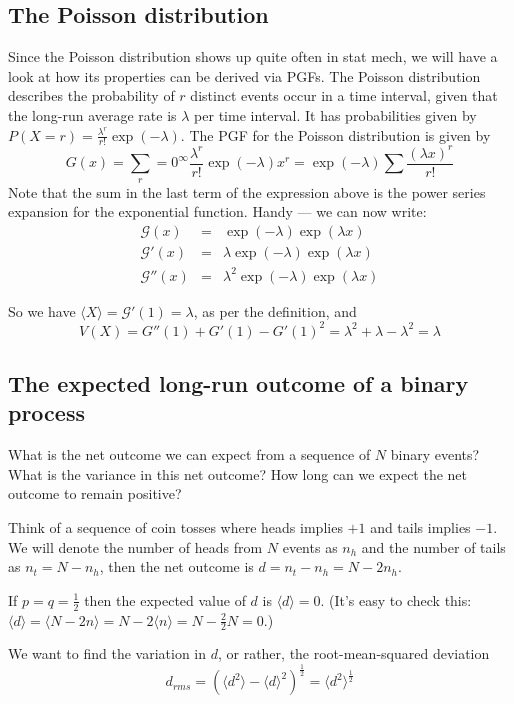 \documentclass{article}
\newcommand{\calG}{\mathcal{G}}
\begin{document}
\subsection*{The Poisson distribution}
Since the Poisson distribution shows up quite often in stat mech, we will have a look at how its properties can be derived via PGFs.
The Poisson distribution describes the probability of $r$ distinct events occur in a time interval, given that the long-run average rate is $\lambda$ per time interval. It has probabilities given by $P(X=r) = \frac{\lambda^r}{r!}\exp(-\lambda)$. The PGF for the Poisson distribution is given by
$$G(x) = \sum_r=0^\infty \frac{\lambda^r}{r!}\exp(-\lambda)x^r = \exp(-\lambda)\sum\frac{(\lambda x)^r}{r!}$$
Note that the sum in the last term of the expression above is the power series expansion for the exponential function. Handy --- we can now write:
\begin{eqnarray*}
\calG(x) &=& \exp(-\lambda)\exp(\lambda x)\\
\calG'(x) &=& \lambda\exp(-\lambda)\exp(\lambda x)\\
\calG''(x)&=&\lambda^2\exp(-\lambda)\exp(\lambda x)
\end{eqnarray*}

So we have $\langle X \rangle = \calG'(1) = \lambda$, as per the definition, and
$$V(X) = G''(1) + G'(1) - G'(1)^2 = \lambda^2+\lambda-\lambda^2 = \lambda$$

\subsection*{The expected long-run outcome of a binary process}
What is the net outcome we can expect from a sequence of $N$ binary events? What is the variance in this net outcome? How long can we expect the net outcome to remain positive? 

Think of a sequence of coin tosses where heads implies $+1$ and tails implies $-1$. We will denote the number of heads from $N$ events as $n_h$ and the number of tails as $n_t = N-n_h$, then the net outcome is $d = n_t-n_h = N-2n_h$. 

If $p=q=\frac12$ then the expected value of $d$ is $\langle d\rangle= 0$. (It's easy to check this: $\langle d\rangle = \langle N-2n\rangle = N-2\langle n\rangle = N-\frac{2}{2}N=0.$)

We want to find the variation in $d$, or rather, the root-mean-squared deviation 
$$d_{rms} = \left(\langle d^2\rangle - \langle d\rangle^2\right)^{\frac12} =  \langle d^2\rangle^{\frac12}$$
\end{document}
